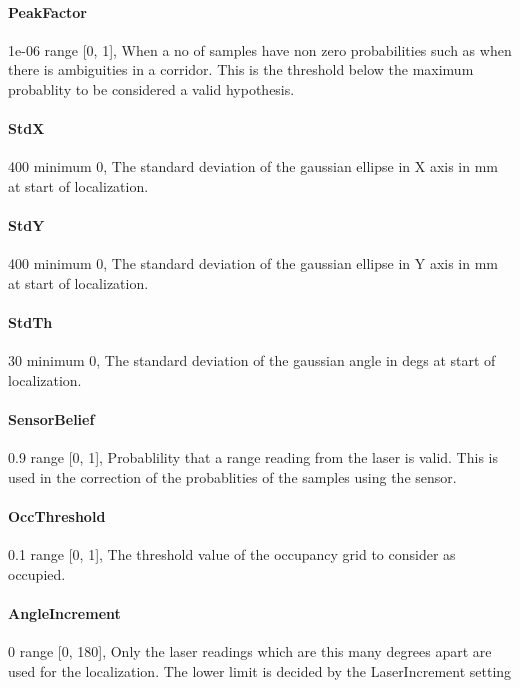 \documentclass{article}
\begin{document}
\paragraph{PeakFactor} 1e-06          range [0, 1],  When a no of samples have non zero
                          probabilities such as when there is ambiguities in a
                          corridor. This is the threshold below the maximum
                          probablity to be considered a valid hypothesis.

\paragraph{StdX} 400                  minimum 0,  The standard deviation of the gaussian
                          ellipse in X axis in mm at start of localization.

\paragraph{StdY} 400                  minimum 0,  The standard deviation of the gaussian
                          ellipse in Y axis in mm at start of localization.

\paragraph{StdTh} 30                  minimum 0,  The standard deviation of the gaussian
                          angle in degs at start of localization.

\paragraph{SensorBelief} 0.9          range [0, 1],  Probablility that a range reading
                          from the laser is valid. This is used in the
                          correction of the probablities of the samples using
                          the sensor.

\paragraph{OccThreshold} 0.1          range [0, 1],  The threshold value of the occupancy
                          grid to consider as occupied.

\paragraph{AngleIncrement} 0          range [0, 180],  Only the laser readings which are
                          this many degrees apart are used for the
                          localization. The lower limit is decided by the
                          LaserIncrement setting
\end{document}
